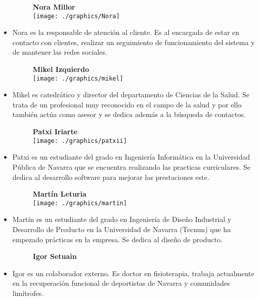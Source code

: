 \begin{itemize}
			\begin{figure}[H]
				\centering
				{\large \textbf{Nora Millor}\\}\smallskip
				\texttt{[image: ./graphics/Nora]}	
			\end{figure}
			\item Nora es la responsable de atención al cliente. Es al encargada de estar en contacto con clientes, realizar un seguimiento de funcionamiento del sistema y de mantener las redes sociales. \\
			\bigskip
			
			
			\begin{figure}[H]
				\centering
				{\large \textbf{Mikel Izquierdo}\\}\smallskip
				\texttt{[image: ./graphics/mikel]}	
			\end{figure}
			\item Mikel es catedrático y director del departamento de Ciencias de la Salud. Se trata de un profesional muy reconocido en el campo de la salud y por ello también actúa como asesor y se dedica además a la búsqueda de contactos.\\
			\bigskip
			
			\begin{figure}[H]
				\centering
				{\large \textbf{Patxi Iriarte}\\}\smallskip
				\texttt{[image: ./graphics/patxii]}	
			\end{figure}
			\item Patxi es un estudiante del grado en Ingeniería Informática en la Universidad Pública de Navarra que se encuentra realizando las practicas curriculares. Se dedica al desarrollo software para mejorar las prestaciones este.\\
			\bigskip
			
			
			\begin{figure}[H]
				\centering
				{\large \textbf{Martín Leturia}\\}\smallskip
				\texttt{[image: ./graphics/martin]}	
			\end{figure}
			\item Martín es un estudiante del grado en Ingeniería de Diseño Industrial y Desarrollo de Producto en la Universidad de Navarra (Tecnun) que ha empezado prácticas en la empresa. Se dedica al diseño de producto.
			\bigskip
			
			
			\begin{figure}[H]
				\centering
				{\large \textbf{Igor Setuain}\\}\smallskip
				
			\end{figure}
			\item Igor es un colaborador externo. Es doctor en fisioterapia, trabaja actualmente en la recuperación funcional de deportistas de Navarra y comunidades limítrofes.\\
			
		\end{itemize}
		\bigskip
	
